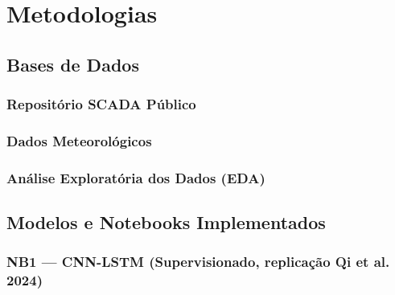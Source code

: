\documentclass[12pt,a4paper]{article}
\begin{document}
\section{Metodologias}

\subsection{Bases de Dados}

\subsubsection{Repositório SCADA Público}


\subsubsection{Dados Meteorológicos}

\subsubsection{Análise Exploratória dos Dados (EDA)}





\subsection{Modelos e Notebooks Implementados}



\subsubsection{NB1 --- CNN-LSTM (Supervisionado, replicação Qi et al. 2024)}
\end{document}
